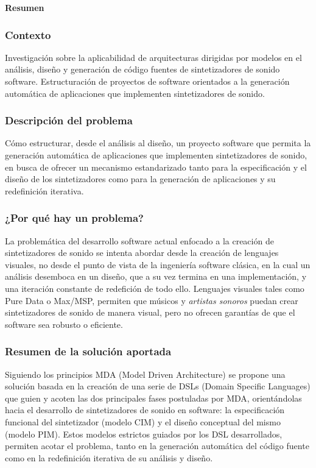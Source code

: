 \begin{center}
    \LARGE \textbf{Resumen}
\end{center}


\subsubsection{Contexto}

Investigación sobre la aplicabilidad de arquitecturas dirigidas por modelos en el análisis, diseño y generación de código fuentes de sintetizadores de sonido software. Estructuración de proyectos de software orientados a la generación automática de aplicaciones que implementen sintetizadores de sonido.

\subsubsection{Descripción del problema}

Cómo estructurar, desde el análisis al diseño, un proyecto software que permita la generación automática de aplicaciones que implementen sintetizadores de sonido, en busca de ofrecer un mecanismo estandarizado tanto para la especificación y el diseño de los sintetizadores como para la generación de aplicaciones y su redefinición iterativa.

\subsubsection{¿Por qué hay un problema?}

La problemática del desarrollo software actual enfocado a la creación de sintetizadores de sonido se intenta abordar desde la creación de lenguajes visuales, no desde el punto de vista de la ingeniería software clásica, en la cual un análisis desemboca en un diseño, que a su vez termina en una implementación, y una iteración constante de redefición de todo ello. Lenguajes visuales tales como Pure Data o Max/MSP, permiten que músicos y \textit{artistas sonoros} puedan crear sintetizadores de sonido de manera visual, pero no ofrecen garantías de que el software sea robusto o eficiente.

\subsubsection{Resumen de la solución aportada}

Siguiendo los principios MDA (Model Driven Architecture) se propone una solución basada en la creación de una serie de DSLs (Domain Specific Languages) que guien y acoten las dos principales fases postuladas por MDA, orientándolas hacia el desarrollo de sintetizadores de sonido en software: la especificación funcional del sintetizador (modelo CIM) y el diseño conceptual del mismo (modelo PIM). Estos modelos estrictos guiados por los DSL desarrollados, permiten acotar el problema, tanto en la generación automática del código fuente como en la redefinición iterativa de su análisis y diseño. 

